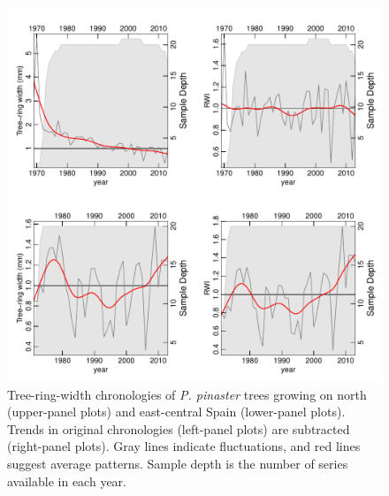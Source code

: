 \documentclass[review,authoryear]{elsarticle}
\begin{document}
\clearpage
\begin{figure}\centering
\includegraphics[scale=0.7,trim=20mm 0mm 20mm 0mm]{RWIs} 
\caption{Tree-ring-width chronologies of \textit{P. pinaster} trees
  growing on north (upper-panel plots) and east-central Spain
  (lower-panel plots). Trends in original chronologies (left-panel
  plots) are subtracted (right-panel plots). Gray lines indicate
  fluctuations, and red lines suggest average patterns. Sample depth
  is the number of series available in each year.}
\label{fig:RWIs} 
\end{figure}
\end{document}

